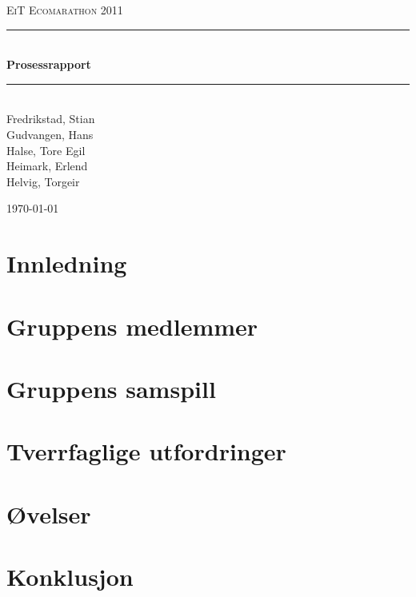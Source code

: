 \documentclass[a4paper,11pt]{report}
\newcommand{\HRule}{\rule{\linewidth}{0.5mm}}
\begin{document}
\begin{titlepage}

\begin{center}
\textsc{\LARGE EiT Ecomarathon 2011}\\[1.5cm]

\HRule \\[0.4cm]
{ \huge \bfseries Prosessrapport}\\[0.4cm]
\HRule \\[1.5cm] 

Fredrikstad, Stian\\
Gudvangen, Hans\\
Halse, Tore Egil\\
Heimark, Erlend\\
Helvig, Torgeir\\

\vfill
 
{\large \today}

\end{center}
\end{titlepage}
\cleardoublepage
{}
\tableofcontents
\clearpage

\chapter{Innledning}

\chapter{Gruppens medlemmer}





\chapter{Gruppens samspill}




\chapter{Tverrfaglige utfordringer}

\chapter{Øvelser}

\chapter{Konklusjon}


\appendix



\clearpage 
\cite{dummy} %
 
 
\end{document}
